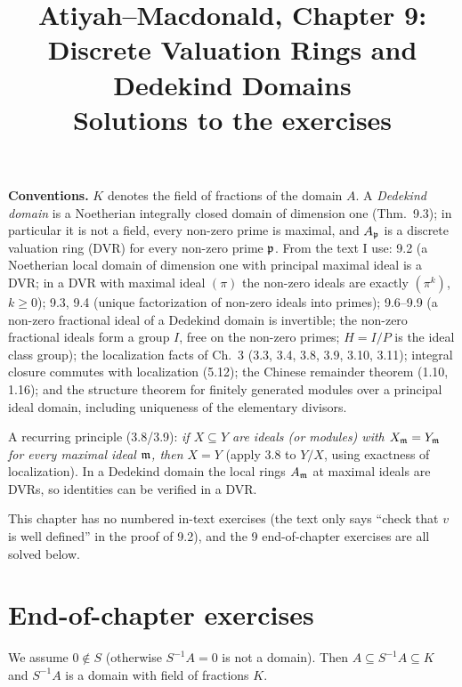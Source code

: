 \documentclass[11pt]{article}
\title{Atiyah--Macdonald, Chapter 9: Discrete Valuation Rings and Dedekind Domains\\[2pt]\large Solutions to the exercises}
\author{}
\date{}
\begin{document}
\maketitle
\noindent\textbf{Conventions.} $K$ denotes the field of fractions of the domain $A$. A \emph{Dedekind domain} is a Noetherian integrally closed domain of dimension one (Thm.~9.3); in particular it is not a field, every non-zero prime is maximal, and $A_\mathfrak p$ is a discrete valuation ring (DVR) for every non-zero prime $\mathfrak p$. From the text I use: 9.2 (a Noetherian local domain of dimension one with principal maximal ideal is a DVR; in a DVR with maximal ideal $(\pi)$ the non-zero ideals are exactly $(\pi^k)$, $k\ge0$); 9.3, 9.4 (unique factorization of non-zero ideals into primes); 9.6--9.9 (a non-zero fractional ideal of a Dedekind domain is invertible; the non-zero fractional ideals form a group $I$, free on the non-zero primes; $H=I/P$ is the ideal class group); the localization facts of Ch.~3 (3.3, 3.4, 3.8, 3.9, 3.10, 3.11); integral closure commutes with localization (5.12); the Chinese remainder theorem (1.10, 1.16); and the structure theorem for finitely generated modules over a principal ideal domain, including uniqueness of the elementary divisors.

A recurring principle (3.8/3.9): \emph{if $X\subseteq Y$ are ideals (or modules) with $X_\mathfrak m=Y_\mathfrak m$ for every maximal ideal $\mathfrak m$, then $X=Y$} (apply 3.8 to $Y/X$, using exactness of localization). In a Dedekind domain the local rings $A_\mathfrak m$ at maximal ideals are DVRs, so identities can be verified in a DVR.

This chapter has no numbered in-text exercises (the text only says ``check that $v$ is well defined'' in the proof of 9.2), and the 9 end-of-chapter exercises are all solved below.

\section*{End-of-chapter exercises}

\pf
We assume $0\notin S$ (otherwise $S^{-1}A=0$ is not a domain). Then $A\subseteq S^{-1}A\subseteq K$ and $S^{-1}A$ is a domain with field of fractions $K$.
\end{document}
